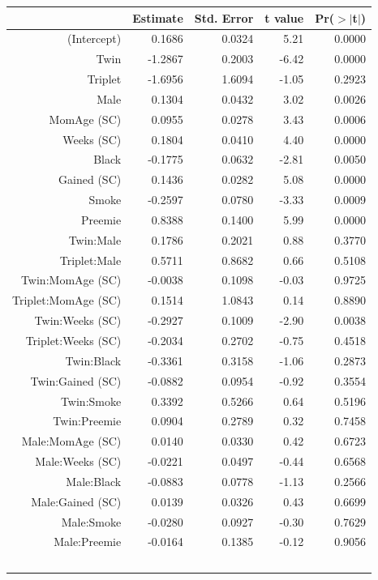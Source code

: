 \documentclass{article}\usepackage[]{graphicx}\usepackage[]{xcolor}
\begin{document}
\begin{table}[ht]
\centering
\begin{tabular}{rrrrr}
  \hline
 & Estimate & Std. Error & t value & Pr($>$$|$t$|$) \\ 
  \hline
(Intercept) & 0.1686 & 0.0324 & 5.21 & 0.0000 \\ 
  Twin & -1.2867 & 0.2003 & -6.42 & 0.0000 \\ 
  Triplet & -1.6956 & 1.6094 & -1.05 & 0.2923 \\ 
  Male & 0.1304 & 0.0432 & 3.02 & 0.0026 \\ 
  MomAge (SC) & 0.0955 & 0.0278 & 3.43 & 0.0006 \\ 
  Weeks (SC) & 0.1804 & 0.0410 & 4.40 & 0.0000 \\ 
  Black & -0.1775 & 0.0632 & -2.81 & 0.0050 \\ 
  Gained (SC) & 0.1436 & 0.0282 & 5.08 & 0.0000 \\ 
  Smoke & -0.2597 & 0.0780 & -3.33 & 0.0009 \\ 
  Preemie & 0.8388 & 0.1400 & 5.99 & 0.0000 \\ 
  Twin:Male & 0.1786 & 0.2021 & 0.88 & 0.3770 \\ 
  Triplet:Male & 0.5711 & 0.8682 & 0.66 & 0.5108 \\ 
  Twin:MomAge (SC) & -0.0038 & 0.1098 & -0.03 & 0.9725 \\ 
  Triplet:MomAge (SC) & 0.1514 & 1.0843 & 0.14 & 0.8890 \\ 
  Twin:Weeks (SC) & -0.2927 & 0.1009 & -2.90 & 0.0038 \\ 
  Triplet:Weeks (SC) & -0.2034 & 0.2702 & -0.75 & 0.4518 \\ 
  Twin:Black & -0.3361 & 0.3158 & -1.06 & 0.2873 \\ 
  Twin:Gained (SC) & -0.0882 & 0.0954 & -0.92 & 0.3554 \\ 
  Twin:Smoke & 0.3392 & 0.5266 & 0.64 & 0.5196 \\ 
  Twin:Preemie & 0.0904 & 0.2789 & 0.32 & 0.7458 \\ 
  Male:MomAge (SC) & 0.0140 & 0.0330 & 0.42 & 0.6723 \\ 
  Male:Weeks (SC) & -0.0221 & 0.0497 & -0.44 & 0.6568 \\ 
  Male:Black & -0.0883 & 0.0778 & -1.13 & 0.2566 \\ 
  Male:Gained (SC) & 0.0139 & 0.0326 & 0.43 & 0.6699 \\ 
  Male:Smoke & -0.0280 & 0.0927 & -0.30 & 0.7629 \\ 
  Male:Preemie & -0.0164 & 0.1385 & -0.12 & 0.9056 \\ 
$$
\end{tabular}
\end{table}
\end{document}
